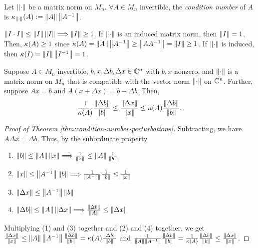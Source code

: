 \begin{definition}
\label{def:condition-number}
Let $\norm{\cdot}$ be a matrix norm on $M_n$. $\forall A \in M_n$ invertible, the \textit{condition number} of $A$ is $\kappa_{\norm{\cdot}}(A) \defeq \norm{A}\norm{A^{-1}}$.
\end{definition}

\begin{note*}
$\norm{I\cdot I} \le \norm{I}\norm{I} \Longrightarrow \norm{I} \ge 1$. If $\norm{\cdot}$ is an induced matrix norm, then $\norm{I} = 1$. Then, $\kp(A) \ge 1$ since $\kp(A) = \norm{A}\norm{A^{-1}} \ge \norm{AA^{-1}} = \norm{I} \ge 1$. If $\norm{\cdot}$ is induced, then $\kp(I) = \norm{I}\norm{I^{-1}} = 1$.
\end{note*}

\begin{theorem}
\label{thm:condition-number-perturbations}
Suppose $A \in M_n$ invertible, $b, x, \Delta b, \Delta x \in \C^n$ with $b, x$ nonzero, and $\norm{\cdot}$ is a matrix norm on $M_n$ that is compatible with the vector norm $\norm{\cdot}$ on $\C^n$. Further, suppose $Ax = b$ and $A(x +\Delta x) = b+\Delta b$. Then,
\[
\frac{1}{\kp(A)}\frac{\norm{\Delta b}}{\norm{b}} \le \frac{\norm{\Delta x}}{\norm{x}} \le \kp(A) \frac{\norm{\Delta b}}{\norm{b}}.
\]
\end{theorem}
\begin{proof}[Proof of Theorem \ref{thm:condition-number-perturbations}]
Subtracting, we have $A\Delta x = \Delta b$. Thus, by the subordinate property
\begin{enumerate}[label=(\arabic*)]
    \item $\norm{b} \le \norm{A}\norm{x} \Longrightarrow \frac{1}{\norm{x}} \le \norm{A}\frac{1}{\norm{b}}$
    \item $\norm{x} \le \norm{A^{-1}}\norm{b} \Longrightarrow \frac{1}{\norm{A^{-1}}} \frac{1}{\norm{b}} \le \frac{1}{\norm{x}}$
    \item $\norm{\Delta x} \le \norm{A^{-1}}\norm{b}$
    \item $\norm{\Delta b} \le \norm{A}\norm{\Delta x} \Longrightarrow \frac{\norm{\Delta b}}{\norm{A}} \le \norm{\Delta x}$
\end{enumerate}
Multiplying (1) and (3) together and (2) and (4) together, we get $\frac{\norm{\Delta x}}{\norm{x}} \le \norm{A}\norm{A^{-1}} \frac{\norm{\Delta b}}{\norm{b}} = \kp(A) \frac{\norm{\Delta b}}{\norm{b}}$ and $\frac{1}{\norm{A}\norm{A^{-1}}} \frac{\norm{\Delta b}}{\norm{b}} = \frac{1}{\kp(A)}\frac{\norm{\Delta b}}{\norm{b}} \le \frac{\norm{\Delta x}}{\norm{x}}$.
\end{proof}

